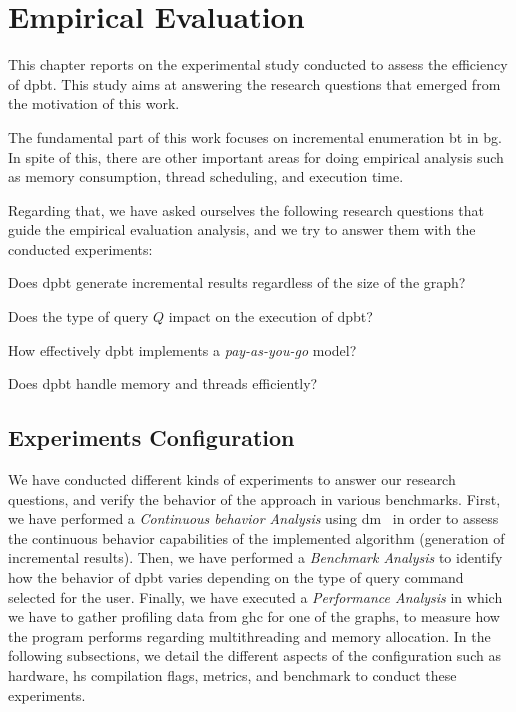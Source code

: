 \chapter{Empirical Evaluation}\label{experiments}
This chapter reports on the experimental study conducted to assess the efficiency of \acrshort{dpbt}. This study aims at answering the research questions that emerged from the motivation of this work. 

The fundamental part of this work focuses on incremental enumeration \acrshort{bt} in \acrshort{bg}. 
In spite of this, there are other important areas for doing empirical analysis such as memory consumption, thread scheduling, and execution time.

Regarding that, we have asked ourselves the following research questions that guide the empirical evaluation analysis, and we try to answer them with the conducted experiments:
\begin{inparaenum}[\bf {\bf RQ}1\upshape)]
\label{res:bt:question}
    \item Does \acrshort{dpbt} generate incremental results regardless of the size of the graph?
    \item Does the type of query $Q$ impact on the execution of \acrshort{dpbt}?
    \item How effectively \acrshort{dpbt} implements a \emph{pay-as-you-go} model?
    \item Does \acrshort{dpbt} handle memory and threads efficiently?
\end{inparaenum}
  
\section{Experiments Configuration}
We have conducted different kinds of experiments to answer our research questions, and verify the behavior of the approach in various benchmarks.
First, we have performed a \emph{Continuous behavior Analysis} using \acrfull{dm}~\cite{diefpaper} in order to assess the continuous behavior capabilities of the implemented algorithm (generation of incremental results). 
Then, we have performed a \emph{Benchmark Analysis} to identify how the behavior of \acrshort{dpbt} varies depending on the type of query command selected for the user.
Finally, we have executed a \textit{Performance Analysis} in which we have to gather profiling data from \acrfull{ghc} for one of the graphs, 
to measure how the program performs regarding multithreading and memory allocation.
In the following subsections, we detail the different aspects of the configuration such as hardware, \acrshort{hs} compilation flags, metrics, and benchmark to conduct these experiments.


